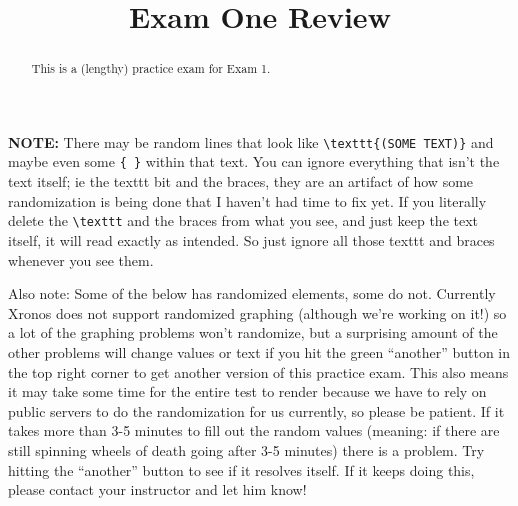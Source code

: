 \documentclass{ximera}
\title{Exam One Review}
\begin{document}
\begin{abstract}
This is a (lengthy) practice exam for Exam 1.
\end{abstract}
\maketitle

\shuffleChoicestrue
\shuffleQuestionstrue
{}

\textbf{NOTE:} There may be random lines that look like \verb|\texttt{(SOME TEXT)}| and maybe even some \verb|{ }| within that text. You can ignore everything that isn't the text itself; ie the texttt bit and the braces, they are an artifact of how some randomization is being done that I haven't had time to fix yet. If you literally delete the \verb|\texttt| and the braces from what you see, and just keep the text itself, it will read exactly as intended. So just ignore all those texttt and braces whenever you see them.

Also note: Some of the below has randomized elements, some do not. Currently Xronos does not support randomized graphing (although we're working on it!) so a lot of the graphing problems won't randomize, but a surprising amount of the other problems will change values or text if you hit the green ``another'' button in the top right corner to get another version of this practice exam. This also means it may take some time for the entire test to render because we have to rely on public servers to do the randomization for us currently, so please be patient. If it takes more than 3-5 minutes to fill out the random values (meaning: if there are still spinning wheels of death going after 3-5 minutes) there is a problem. Try hitting the ``another'' button to see if it resolves itself. If it keeps doing this, please contact your instructor and let him know!
\end{document}
